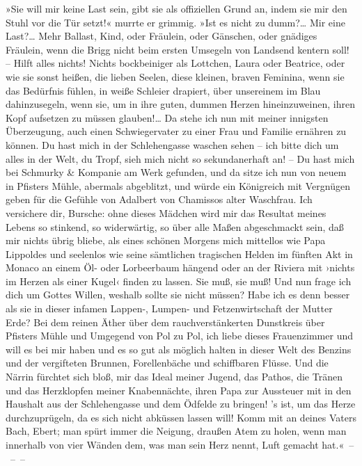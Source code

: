 »Sie will mir keine Last sein, gibt sie als offiziellen Grund an,
indem sie mir den Stuhl vor die Tür setzt!« murrte er grimmig. »Ist
es nicht zu dumm?\ldots{} Mir eine Last?\ldots{} Mehr Ballast, Kind, oder
Fräulein, oder Gänschen, oder gnädiges Fräulein, wenn die Brigg
nicht beim ersten Umsegeln von Landsend kentern soll! – Hilft alles
nichts! Nichts bockbeiniger als Lottchen, Laura oder Beatrice, oder
wie sie sonst heißen, die lieben Seelen, diese kleinen, braven
Feminina, wenn sie das Bedürfnis fühlen, in weiße Schleier
drapiert, über unsereinem im Blau dahinzusegeln, wenn sie, um in
ihre guten, dummen Herzen hineinzuweinen, ihren Kopf aufsetzen zu
müssen glauben!\ldots{} Da stehe ich nun mit meiner innigsten
Überzeugung, auch einen Schwiegervater zu einer Frau und Familie
ernähren zu können. Du hast mich in der Schlehengasse waschen sehen
– ich bitte dich um alles in der Welt, du Tropf, sieh mich nicht so
sekundanerhaft an! – Du hast mich bei Schmurky \& Kompanie am Werk
gefunden, und da sitze ich nun von neuem in Pfisters Mühle,
abermals abgeblitzt, und würde ein Königreich mit Vergnügen geben
für die Gefühle von Adalbert von Chamissos alter Waschfrau. Ich
versichere dir, Bursche: ohne dieses Mädchen wird mir das Resultat
meines Lebens so stinkend, so widerwärtig, so über alle Maßen
abgeschmackt sein, daß mir nichts übrig bliebe, als eines schönen
Morgens mich mittellos wie Papa Lippoldes und seelenlos wie seine
sämtlichen tragischen Helden im fünften Akt in Monaco an einem Öl-
oder Lorbeerbaum hängend oder an der Riviera mit ›nichts im Herzen
als einer Kugel‹ finden zu lassen. Sie muß, sie muß! Und nun frage
ich dich um Gottes Willen, weshalb sollte sie nicht müssen? Habe
ich es denn besser als sie in dieser infamen Lappen-, Lumpen- und
Fetzenwirtschaft der Mutter Erde? Bei dem reinen Äther über dem
rauchverstänkerten Dunstkreis über Pfisters Mühle und Umgegend von
Pol zu Pol, ich liebe dieses Frauenzimmer und will es bei mir haben
und es so gut als möglich halten in dieser Welt des Benzins und der
vergifteten Brunnen, Forellenbäche und schiffbaren Flüsse. Und die
Närrin fürchtet sich bloß, mir das Ideal meiner Jugend, das Pathos,
die Tränen und das Herzklopfen meiner Knabennächte, ihren Papa zur
Aussteuer mit in den Haushalt aus der Schlehengasse und dem Ödfelde
zu bringen! 's ist, um das Herze durchzuprügeln, da es sich nicht
abküssen lassen will! Komm mit an deines Vaters Bach, Ebert; man
spürt immer die Neigung, draußen Atem zu holen, wenn man innerhalb
von vier Wänden dem, was man sein Herz nennt, Luft gemacht
hat.«~–~–~–

